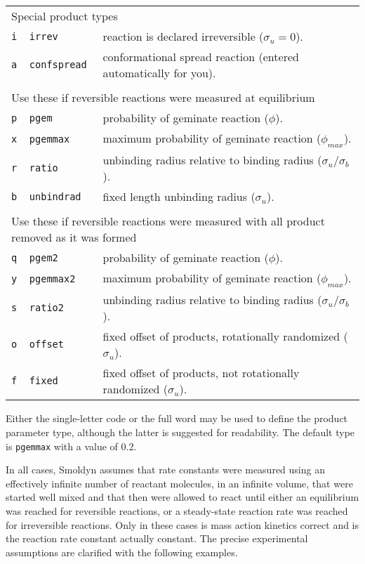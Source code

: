 \documentclass {scrbook}
\newcommand {\ttt} {\texttt}
\begin{document}
\begin{longtable}[c]{lll}
\multicolumn{3}{l}{Special product types}\\
\ttt{i} & \ttt{irrev} & reaction is declared irreversible ($\sigma_u=0$).\\
\ttt{a} & \ttt{confspread} & conformational spread reaction (entered automatically for you).\\ \\
\multicolumn{3}{l}{Use these if reversible reactions were measured at equilibrium}\\
\ttt{p} & \ttt{pgem} & probability of geminate reaction ($\phi$).\\
\ttt{x} & \ttt{pgemmax} & maximum probability of geminate reaction ($\phi_{max}$).\\
\ttt{r} & \ttt{ratio} & unbinding radius relative to binding radius ($\sigma_u/\sigma_b$).\\
\ttt{b} & \ttt{unbindrad} & fixed length unbinding radius ($\sigma_u$).\\ \\
\multicolumn{3}{l}{Use these if reversible reactions were measured with all product removed as it was formed}\\
\ttt{q} & \ttt{pgem2} & probability of geminate reaction ($\phi$).\\
\ttt{y} & \ttt{pgemmax2} & maximum probability of geminate reaction ($\phi_{max}$).\\
\ttt{s} & \ttt{ratio2} & unbinding radius relative to binding radius ($\sigma_u/\sigma_b$).\\
\ttt{o} & \ttt{offset} & fixed offset of products, rotationally randomized ($\sigma_u$).\\
\ttt{f} & \ttt{fixed} & fixed offset of products, not rotationally randomized ($\sigma_u$).
\end{longtable}

Either the single-letter code or the full word may be used to define the product parameter type, although the latter is suggested for readability. The default type is \ttt{pgemmax} with a value of 0.2.

In all cases, Smoldyn assumes that rate constants were measured using an effectively infinite number of reactant molecules, in an infinite volume, that were started well mixed and that then were allowed to react until either an equilibrium was reached for reversible reactions, or a steady-state reaction rate was reached for irreversible reactions. Only in these cases is mass action kinetics correct and is the reaction rate constant actually constant. The precise experimental assumptions are clarified with the following examples.
\end{document}
